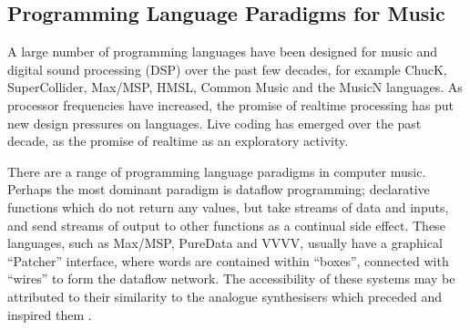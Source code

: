 \documentclass[authoryear]{sigplanconf}
\begin{document}

\subsection{Programming Language Paradigms for Music}


A large number of programming languages have been designed for music
and digital sound processing (DSP) over the past few decades, for
example ChucK, SuperCollider, Max/MSP, HMSL, Common Music and the
MusicN languages. As processor frequencies have increased, the promise
of realtime processing has put new design pressures on languages. Live
coding has emerged over the past decade, as the promise of realtime as
an exploratory activity.

There are a range of programming language paradigms in computer
music. Perhaps the most dominant paradigm is dataflow programming;
declarative functions which do not return any values, but take streams
of data and inputs, and send streams of output to other functions as a
continual side effect. These languages, such as Max/MSP, PureData and
VVVV, usually have a graphical ``Patcher'' interface, where words are
contained within ``boxes'', connected with ``wires'' to form the
dataflow network. The accessibility of these systems may be attributed
to their similarity to the analogue synthesisers which preceded and
inspired them \citep{Puckette88}.
\end{document}
